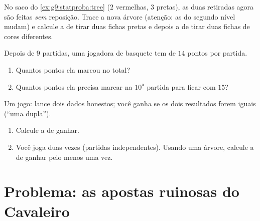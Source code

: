 \begin{exercise}[$\star\star$]\label{exo:g9:statproba:7}
No saco do \cref{ex:g9:statproba:tree} ($2$ vermelhas, $3$ pretas), as
duas retiradas agora são feitas \emph{sem} reposição. Trace a nova
árvore (atenção: as  do segundo nível mudam) e calcule a
 de tirar duas fichas pretas e depois a de tirar duas
fichas de cores diferentes.
\end{exercise}

\begin{exercise}[$\star\star$]\label{exo:g9:statproba:8}
Depois de $9$ partidas, uma jogadora de basquete tem  de $14$
pontos por partida.
\begin{enumerate}
  \item Quantos pontos ela marcou no total?
  \item Quantos pontos ela precisa marcar na $10^{\text{a}}$ partida
        para ficar com  $15$?
\end{enumerate}
\end{exercise}

\begin{exercise}[$\star\star\star$]\label{exo:g9:statproba:9}
Um jogo: lance dois dados honestos; você ganha se os dois resultados
forem iguais (``uma dupla'').
\begin{enumerate}
  \item Calcule a  de ganhar.
  \item Você joga duas vezes (partidas independentes). Usando uma
        árvore, calcule a  de ganhar pelo menos uma vez.
\end{enumerate}
\end{exercise}

\section{Problema: as apostas ruinosas do Cavaleiro}

